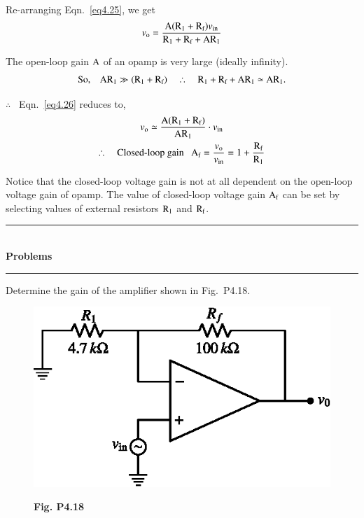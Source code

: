 Re-arranging Eqn.~\eqref{eq4.25}, we get
\begin{equation}
v_{\textrm{o}}=\dfrac{\textrm{A} (\textrm{R}_{1}+\textrm{R}_{\textrm{f}})v_{\text{in}}}{\textrm{R}_{1}+\textrm{R}_{\textrm{f}}+\textrm{A}\textrm{R}_{1}}\label{eq4.26}
\end{equation}

The open-loop gain $\textrm{A}$ of an opamp is very large (ideally infinity).
$$
\text{So,}\quad \textrm{A}\textrm{R}_{1}\gg (\textrm{R}_{1}+\textrm{R}_{\textrm{f}})\quad\therefore\quad \textrm{R}_{1}+\textrm{R}_{\textrm{f}}+\textrm{A}\textrm{R}_{1}\simeq \textrm{A}\textrm{R}_{1}.
$$

$\therefore$~ Eqn.~\eqref{eq4.26} reduces to,
\begin{gather}
v_{\textrm{o}}\simeq \dfrac{\textrm{A}(\textrm{R}_{1}+\textrm{R}_{\textrm{f}})}{\textrm{A}\textrm{R}_{1}}\cdot v_{\text{in}}\notag\\
\therefore\quad \text{Closed-loop gain~~ } \textrm{A}_{\textrm{f}}=\frac{v_{\textrm{o}}}{v_{\text{in}}}=1+\frac{\textrm{R}_{\textrm{f}}}{\textrm{R}_{1}}\label{eq4.27}
\end{gather}

Notice that the closed-loop voltage gain is not at all dependent on the open-loop voltage gain of opamp. The value of closed-loop voltage gain $\textrm{A}_{\textrm{f}}$ can be set by selecting values of external resistors $\textrm{R}_{1}$ and $\textrm{R}_{\textrm{f}}$.

\begin{center}
\rule{4cm}{1pt}\\
{\bf\Large Problems}\\[-3pt]
\rule{4cm}{1pt}
\end{center}

\begin{problem}\label{prob4.18}
Determine the gain of the amplifier shown in Fig.~P4.18.
\begin{figure}[H]
\centering
\includegraphics{chap4/figP4.18.eps}

\smallskip
{\bf Fig. P4.18}
\end{figure}
\end{problem}


